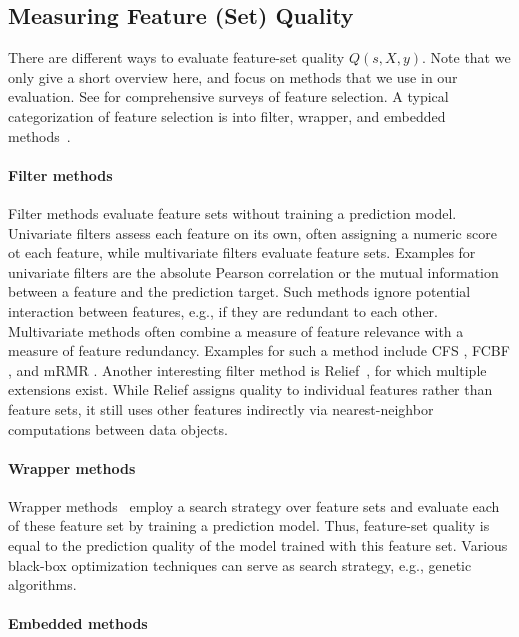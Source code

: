 \documentclass{article}
\theoremstyle{definition}
\begin{document}
\subsection{Measuring Feature (Set) Quality}
\label{sec:fundamentals:quality}

There are different ways to evaluate feature-set quality $Q(s,X,y)$.
Note that we only give a short overview here, and focus on methods that we use in our evaluation.
See \cite{chandrashekar2014survey,li2017feature} for comprehensive surveys of feature selection.
A typical categorization of feature selection is into filter, wrapper, and embedded methods~\cite{guyon2003introduction}.

\paragraph{Filter methods}

Filter methods evaluate feature sets without training a prediction model.
Univariate filters assess each feature on its own, often assigning a numeric score ot each feature, while multivariate filters evaluate feature sets.
Examples for univariate filters are the absolute Pearson correlation or the mutual information between a feature and the prediction target.
Such methods ignore potential interaction between features, e.g., if they are redundant to each other.
Multivariate methods often combine a measure of feature relevance with a measure of feature redundancy.
Examples for such a method include CFS \cite{hall1999correlation}, FCBF \cite{yu2003feature}, and mRMR \cite{peng2005feature}.
Another interesting filter method is Relief~\cite{kira1992feature}, for which multiple extensions exist.
While Relief assigns quality to individual features rather than feature sets, it still uses other features indirectly via nearest-neighbor computations between data objects.

\paragraph{Wrapper methods}

Wrapper methods~\cite{kohavi1997wrappers} employ a search strategy over feature sets and evaluate each of these feature set by training a prediction model.
Thus, feature-set quality is equal to the prediction quality of the model trained with this feature set.
Various black-box optimization techniques can serve as search strategy, e.g., genetic algorithms.

\paragraph{Embedded methods}
\end{document}
